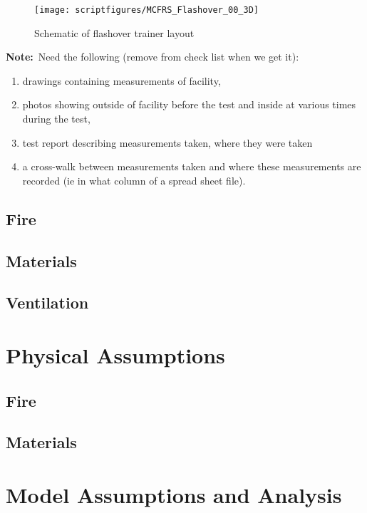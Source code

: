 \documentclass[11pt]{book}
\newcommand{\note}{{\bf Note:}}
\begin{document}
\begin{figure}[\figoptions]
\begin{center}
\texttt{[image: scriptfigures/MCFRS\_Flashover\_00\_3D]}\\
\end{center}
\caption {Schematic of flashover trainer layout}
\label{figflashoverplan}%
\end{figure}

\note\ Need the following (remove from check list when we get it):
\begin{enumerate}
\item drawings containing measurements of facility,
\item photos showing outside of facility before the test and inside at various times during the test,
\item test report describing
measurements taken, where they were taken
\item a cross-walk between measurements taken and where these measurements are recorded (ie
in what column of a spread sheet file).
\end{enumerate}

\subsection{Fire}

\subsection{Materials}

\subsection{Ventilation}

\section{Physical Assumptions}
\subsection{Fire}

\subsection{Materials}

\section{Model Assumptions and Analysis}
\end{document}
